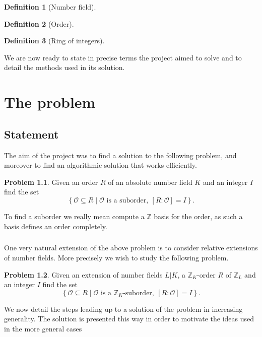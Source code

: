 \documentclass[11pt,a4paper]{report}
\theoremstyle{definition}
\newtheorem{defn}{Definition}
\newtheorem{prob}{Problem}
\begin{document}
\begin{defn}[Number field]
\end{defn}

\begin{defn}[Order]
\end{defn}

\begin{defn}[Ring of integers]
\end{defn}


We are now ready to state in precise terms the project aimed to solve and to detail the methods used in its solution.

\chapter{The problem}
\section{Statement}

The aim of the project was to find a solution to the following problem, and moreover to find an algorithmic solution that works efficiently.

\begin{prob}
Given an order $R$ of an absolute number field $K$ and an integer $I$ find the set
\[\left\{ \mathcal{O}\subseteq R \mid \mathcal{O}\text{ is a suborder},\ [R:\mathcal{O}] = I\right\}.\]
\end{prob}

To find a suborder we really mean compute a $\mathbb{Z}$ basis for the order, as such a basis defines an order completely.

\paragraph{}
One very natural extension of the above problem is to consider relative extensions of number fields.
More precisely we wish to study the following problem.

\begin{prob} %
Given an extension of number fields $L|K$, a $\mathbb{Z}_K$-order $R$ of $\mathbb{Z}_L$ and an integer $I$ find the set
\[\left\{ \mathcal{O}\subseteq R \mid \mathcal{O}\text{ is a $\mathbb{Z}_K$-suborder},\ [R:\mathcal{O}] = I\right\}.\]
\end{prob}

We now detail the steps leading up to a solution of the problem in increasing generality.
The solution is presented this way in order to motivate the ideas used in the more general cases
\end{document}
